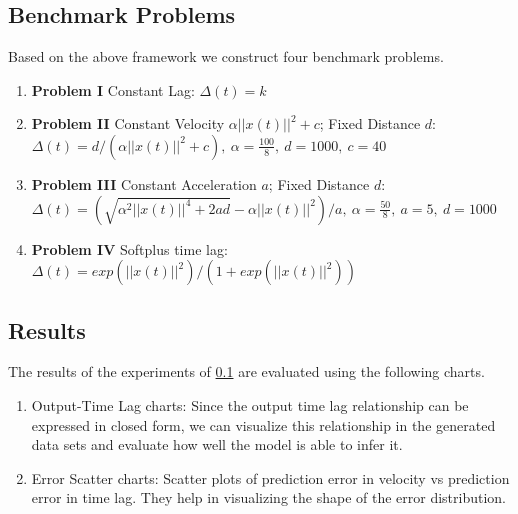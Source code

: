 \documentclass[runningheads]{llncs}
\begin{document}
\subsection{Benchmark Problems}\label{sec:benchmark}

Based on the above framework we construct four benchmark problems.

\begin{enumerate}
\item \textbf{Problem I} Constant Lag: \newline 
$\Delta(t) = k$

\item \textbf{Problem II} Constant Velocity $\alpha ||x(t)||^2 + c$; Fixed Distance $d$: 
\newline $\Delta(t) = d/(\alpha ||x(t)||^2 + c),\ \alpha = \frac{100}{8},\ d = 1000,\ c = 40$

\item \textbf{Problem III} Constant Acceleration $a$; Fixed Distance $d$: 
\newline $\Delta(t) = (\sqrt{\alpha^2||x(t)||^4 + 2ad} - \alpha||x(t)||^2)/a,\ \alpha = \frac{50}{8},\ a = 5,\ d = 1000$

\item \textbf{Problem IV} Softplus time lag: 
\newline $\Delta(t) = exp\left(||x(t)||^2\right)/\left(1 + exp(||x(t)||^2)\right)$

\end{enumerate}



\subsection{Results}

The results of the experiments of \ref{sec:benchmark} are evaluated using the following charts.

\begin{enumerate}
    \item Output-Time Lag charts: Since the output time lag relationship can be expressed in closed 
          form, we can visualize this relationship in the generated data sets and evaluate how well 
          the model is able to infer it.
    \item Error Scatter charts: Scatter plots of prediction error in velocity vs prediction error 
          in time lag. They help in visualizing the shape of the error distribution.
\end{enumerate}
\end{document}
